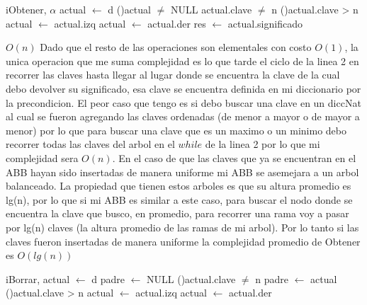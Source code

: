 \begin{Algoritmos}
\begin{algoritmo}{iObtener}{, }{$\alpha$}
			actual $\leftarrow$ d 
            \While(){actual $\neq$ NULL \yluego actual.clave $\neq$ n}{
            	\eIf(){actual.clave > n}{
                	actual $\leftarrow$ actual.izq 
                }{
                	actual $\leftarrow$ actual.der 
                }
                }
            res $\leftarrow$ actual.significado 
\end{algoritmo}
\datosAlgoritmo{} %
  {} %
  {} %
  {$O(n)$} %
  {Dado que el resto de las operaciones son elementales con costo $O(1)$, la unica operacion que me suma complejidad es lo que tarde el ciclo de la linea 2 en recorrer las claves hasta llegar al lugar donde se encuentra la clave de la cual debo devolver su significado, esa clave se encuentra definida en mi diccionario por la precondicion. El peor caso que tengo es si debo buscar una clave en un diccNat al cual se fueron agregando las claves ordenadas (de menor a mayor o de mayor a menor) por lo que para buscar una clave que es un maximo o un minimo debo recorrer todas las claves del arbol en el $while$ de la linea 2 por lo que mi complejidad sera $O(n)$. En el caso de que las claves que ya se encuentran en el ABB hayan sido insertadas de manera uniforme mi ABB se asemejara a un arbol balanceado. La propiedad que tienen estos arboles es que su altura promedio es lg(n), por lo que si mi ABB es similar a este caso, para buscar el nodo donde se encuentra la clave que busco, en promedio, para recorrer una rama voy a pasar por lg(n) claves (la altura promedio de las ramas de mi arbol). Por lo tanto si las claves fueron insertadas de manera uniforme la complejidad promedio de Obtener es $O(lg(n))$} %
\begin{algoritmo}{iBorrar}{, }{}
			actual $\leftarrow$ d 
            padre $\leftarrow$ NULL 
            \While(){actual.clave $\neq$ n}{
            	padre $\leftarrow$ actual 
            	\eIf(){actual.clave > n}{
                	actual $\leftarrow$ actual.izq 
                }{
                	actual $\leftarrow$ actual.der 
            }
            }


\end{algoritmo}
\end{Algoritmos}
